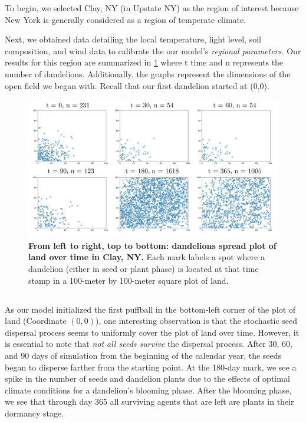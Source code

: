 To begin, we selected Clay, NY (in Upstate NY) as the region of interest because New York is generally considered as a region of temperate climate.

Next, we obtained data detailing the local temperature, light level, soil composition, and wind data to calibrate the our model's \textit{regional parameters.} Our results for this region are summarized in \ref{fig:temperatespread} where t  time and n represents the number of dandelions. Additionally, the graphs represent the dimensions of the open field we began with. Recall that our first dandelion started at (0,0).

\begin{figure}[h!]
\centering
    \includegraphics[scale=0.5]{figures/moderateclimatespread.pdf}
    \captionsetup{width=0.9\textwidth}
    \caption{\textbf{From left to right, top to bottom: dandelions spread plot of land over time in Clay, NY.} Each mark labels a spot where a dandelion (either in seed or plant phase) is located at that time stamp in a 100-meter by 100-meter square plot of land.}
    \label{fig:temperatespread}
\end{figure}

\subsection{}
As our model initialized the first puffball in the bottom-left corner of the plot of land (Coordinate \((0, 0)\)), one interesting observation is that the stochastic seed dispersal process seems to uniformly cover the plot of land over time. However, it is essential to note that \textit{not all seeds survive} the dispersal process. After 30, 60, and 90 days of simulation from the beginning of the calendar year, the seeds began to disperse farther from the starting point. At the 180-day mark, we see a spike in the number of seeds and dandelion plants due to the effects of optimal climate conditions for a dandelion's blooming phase. After the blooming phase, we see that through day 365 all surviving agents that are left are plants in their dormancy stage.

